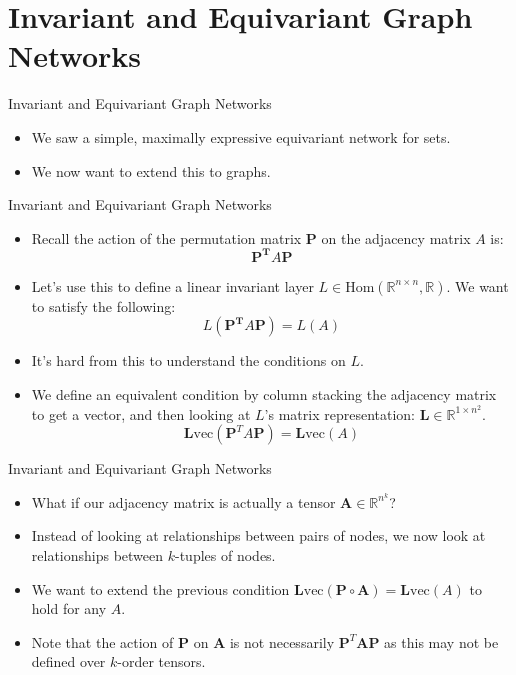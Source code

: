 \documentclass{beamer}
\begin{document}
\section{Invariant and Equivariant Graph Networks}

\begin{frame}{Invariant and Equivariant Graph Networks}
    \begin{itemize}
        \setlength{\itemsep}{\fill}
        \item We saw a simple, maximally expressive equivariant network for sets.
        \item We now want to extend this to graphs.
    \end{itemize}
\end{frame}
\begin{frame}{Invariant and Equivariant Graph Networks}
    \begin{itemize}
        \setlength{\itemsep}{\fill}
        \item Recall the action of the permutation matrix $\boldsymbol{P}$ on the adjacency matrix $A$ is:
        \[\boldsymbol{P^T}A\boldsymbol{P}\]
        \item Let's use this to define a linear invariant layer $L \in \text{Hom}(\mathbb{R}^{n\times n}, \mathbb{R})$. We want to satisfy the following:
        \[ L(\boldsymbol{P^T}A\boldsymbol{P}) = L(A) \]
        \item It's hard from this to understand the conditions on $L$. 
        \pause
        \item We define an equivalent condition by column stacking the adjacency matrix to get a vector, and then looking at $L$'s matrix representation: $\mathbf{L} \in \mathbb{R}^{1 \times n^2}$.
        \[ \mathbf{L}\text{vec}(\boldsymbol{P}^T A\boldsymbol{P}) = \mathbf{L}\text{vec}(A) \]
    \end{itemize}
\end{frame}
\begin{frame}{Invariant and Equivariant Graph Networks}
    \begin{itemize}
        \setlength{\itemsep}{\fill}
        \item What if our adjacency matrix is actually a tensor $\mathbf{A} \in \mathbb{R}^{n^k}$?
        \item Instead of looking at relationships between pairs of nodes, we now look at relationships between $k$-tuples of nodes.
        \item We want to extend the previous condition \(\mathbf{L}\text{vec}(\boldsymbol{P} \circ \mathbf{A}) = \mathbf{L}\text{vec}(A)\) to hold for any $A$.
        \item Note that the action of $\boldsymbol{P}$ on $\mathbf{A}$ is not necessarily $\boldsymbol{P}^T \mathbf{A} \boldsymbol{P}$ as this may not be defined over $k$-order tensors. 
    \end{itemize}
\end{frame}
\end{document}
